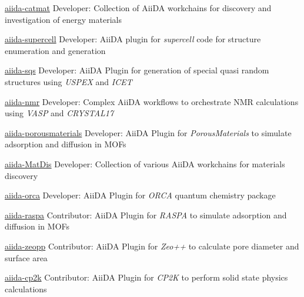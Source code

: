 


\begin{cvskillsnoncentered}
    
\cvskill
    {\href{https://github.com/pzarabadip/aiida-catmat}{aiida-catmat}} %
    {Developer: Collection of AiiDA workchains for discovery and investigation of energy materials}

\cvskill
    {\href{https://github.com/pzarabadip/aiida-supercell}{aiida-supercell}} %
    {Developer: AiiDA plugin for \textit{supercell} code for structure enumeration and generation}

\cvskill
    {\href{https://github.com/pzarabadip/aiida-sqs}{aiida-sqs}} %
    {Developer: AiiDA Plugin for generation of special quasi random structures using \textit{USPEX} and \textit{ICET}}

\cvskill
    {\href{https://github.com/pzarabadip/aiida-nmr}{aiida-nmr}} %
    {Developer: Complex AiiDA workflows to orchestrate NMR calculations using \textit{VASP} and \textit{CRYSTAL17}}

\cvskill
    {\href{https://github.com/pzarabadip/aiida-porousmaterials}{aiida-porousmaterials}} %
    {Developer: AiiDA Plugin for \textit{PorousMaterials} to simulate adsorption and diffusion in MOFs}

\cvskill
    {\href{https://github.com/pzarabadip/aiida-MatDis}{aiida-MatDis}} %
    {Developer: Collection of various AiiDA workchains for materials discovery}

\cvskill
    {\href{https://github.com/pzarabadip/aiida-orca}{aiida-orca}} %
    {Developer: AiiDA Plugin for \textit{ORCA} quantum chemistry package}

\cvskill
    {\href{https://github.com/yakutovicha/aiida-raspa}{aiida-raspa}} %
    {Contributor: AiiDA Plugin for \textit{RASPA} to simulate adsorption and diffusion in MOFs}

\cvskill
    {\href{https://github.com/ltalirz/aiida-zeopp}{aiida-zeopp}} %
    {Contributor: AiiDA Plugin for \textit{Zeo++} to calculate pore diameter and surface area}

\cvskill
    {\href{https://github.com/aiidateam/aiida-cp2k}{aiida-cp2k}} %
    {Contributor: AiiDA Plugin for \textit{CP2K} to perform solid state physics calculations}

    
\end{cvskillsnoncentered}
\clearpage
